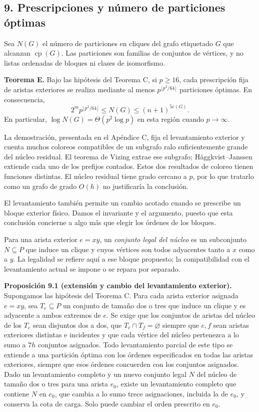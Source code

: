\documentclass[spanish,11pt,a4paper]{article}
\begin{document}
\subsection{9. Prescripciones y número de particiones
óptimas}\label{prescripciones-y-nuxfamero-de-particiones-uxf3ptimas}

Sea \(N(G)\) el número de particiones en cliques del grafo etiquetado
\(G\) que alcanzan \(\operatorname{cp}(G)\). Las particiones son
familias de conjuntos de vértices, y no listas ordenadas de bloques ni
clases de isomorfismo.

\textbf{Teorema E.} Bajo las hipótesis del Teorema C, si \(p\ge16\),
cada prescripción fija de aristas exteriores se realiza mediante al
menos \(p^{\lfloor p^2/64\rfloor}\) particiones óptimas. En
consecuencia, \[
2^m p^{\lfloor p^2/64\rfloor}\le N(G)\le(n+1)^{5e(G)}.
\] En particular, \(\log N(G)=\Theta(p^2\log p)\) en esta región cuando
\(p\to\infty\).

La demostración, presentada en el Apéndice C, fija el levantamiento
exterior y cuenta muchos coloreos compatibles de un subgrafo ralo
suficientemente grande del núcleo residual. El teorema de Vizing extrae
ese subgrafo; Häggkvist--Janssen extiende cada uno de los prefijos
contados. Estos dos resultados de coloreo tienen funciones distintas. El
núcleo residual tiene grado cercano a \(p\), por lo que tratarlo como un
grafo de grado \(O(h)\) no justificaría la conclusión.

El levantamiento también permite un cambio acotado cuando se prescribe
un bloque exterior físico. Damos el invariante y el argumento, puesto
que esta conclusión concierne a algo más que elegir los órdenes de los
bloques.

Para una arista exterior \(e=xy\), un \emph{conjunto legal del núcleo}
es un subconjunto \(N\subseteq P\) que induce un clique y cuyos vértices
son todos adyacentes tanto a \(x\) como a \(y\). La legalidad se refiere
aquí a ese bloque propuesto; la compatibilidad con el levantamiento
actual se impone o se repara por separado.

\textbf{Proposición 9.1 (extensión y cambio del levantamiento
exterior).} Supongamos las hipótesis del Teorema C. Para cada arista
exterior asignada \(e=xy\), sea \(T_e\subseteq P\) un conjunto de tamaño
dos o tres que induce un clique y es adyacente a ambos extremos de
\(e\). Se exige que los conjuntos de aristas del núcleo de los \(T_e\)
sean disjuntos dos a dos, que \(T_e\cap T_f=\varnothing\) siempre que
\(e,f\) sean aristas exteriores distintas e incidentes y que cada
vértice del núcleo pertenezca a lo sumo a \(7h\) conjuntos asignados.
Todo levantamiento parcial de este tipo se extiende a una partición
óptima con los órdenes especificados en todas las aristas exteriores,
siempre que esos órdenes concuerden con los conjuntos asignados. Dado un
levantamiento completo y un nuevo conjunto legal \(N\) del núcleo de
tamaño dos o tres para una arista \(e_0\), existe un levantamiento
completo que contiene \(N\) en \(e_0\), que cambia a lo sumo trece
asignaciones, incluida la de \(e_0\), y conserva la cota de carga. Solo
puede cambiar el orden prescrito en \(e_0\).
\end{document}
